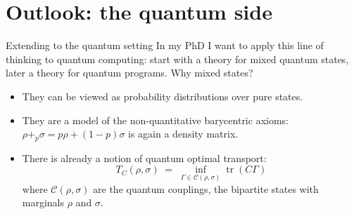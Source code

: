 \documentclass[10pt,aspectratio=169]{beamer}
\newcommand{\bpl}[1]{+_{#1}}
\begin{document}
                \section{Outlook: the quantum side}

                \begin{frame}{Extending to the quantum setting}
                    In my PhD I want to apply this line of
                    thinking to quantum
                    computing: start with a theory for mixed
                    quantum states, later a
                    theory for quantum programs.
                    \vfill
                    Why mixed states?
                    \begin{itemize}
                        \item[--] They can be viewed as
                            probability distributions over pure
                            states.
                            \medskip
                        \item[--] They are a model of the
                            non-quantitative barycentric
                            axioms: $\rho \bpl{p} \sigma = p\rho
                            + (1-p)\sigma$ is again a
                            density matrix.
                            \medskip
                        \item[--] There is already a notion of
                            quantum optimal transport:
                            \[
                                T_C(\rho,\sigma) \;=\;
                                \inf_{\Gamma \in
                                \mathcal{C}(\rho,\sigma)}
                                \operatorname{tr}(C\Gamma)
                            \]
                            where $\mathcal{C}(\rho,\sigma)$ are
                            the quantum couplings, the
                            bipartite states with marginals
                            $\rho$ and $\sigma$.
                    \end{itemize}
                \end{frame}
\end{document}

